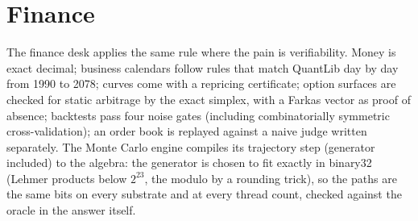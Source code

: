 \section{Finance}

The finance desk applies the same rule where the pain is verifiability. Money is exact decimal;
business calendars follow rules that match QuantLib day by day from 1990 to 2078; curves come with a
repricing certificate; option surfaces are checked for static arbitrage by the exact simplex, with a
Farkas vector as proof of absence; backtests pass four noise gates (including combinatorially symmetric
cross-validation); an order book is replayed against a naive judge written separately. The Monte Carlo
engine compiles its trajectory step (generator included) to the algebra: the generator is chosen to fit
exactly in binary32 (Lehmer products below $2^{23}$, the modulo by a rounding trick), so the paths are the
same bits on every substrate and at every thread count, checked against the oracle in the answer itself.
